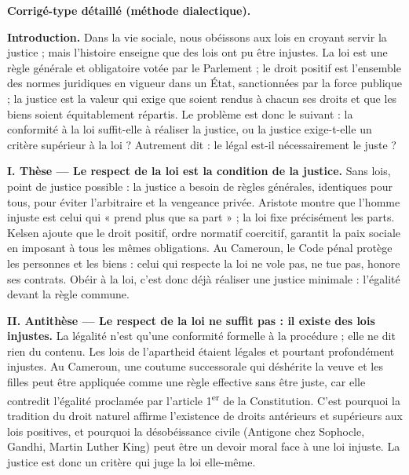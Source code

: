 \documentclass[11pt]{article}
\newcommand{\cle}[1]{{\popxbold\color{popdark}#1}}
\begin{document}
\begin{corrige}
\textbf{Corrigé-type détaillé (méthode dialectique).}

\textbf{Introduction.} Dans la vie sociale, nous obéissons aux lois en croyant servir la justice ; mais l'histoire enseigne que des lois ont pu être injustes. La \cle{loi} est une règle générale et obligatoire votée par le Parlement ; le \cle{droit positif} est l'ensemble des normes juridiques en vigueur dans un État, sanctionnées par la force publique ; la \cle{justice} est la valeur qui exige que soient rendus à chacun ses droits et que les biens soient équitablement répartis. Le problème est donc le suivant : la conformité à la loi suffit-elle à réaliser la justice, ou la justice exige-t-elle un critère supérieur à la loi ? Autrement dit : le légal est-il nécessairement le juste ?

\textbf{I. Thèse — Le respect de la loi est la condition de la justice.} Sans lois, point de justice possible : la justice a besoin de règles générales, identiques pour tous, pour éviter l'arbitraire et la vengeance privée. Aristote montre que l'homme injuste est celui qui « prend plus que sa part » ; la loi fixe précisément les parts. Kelsen ajoute que le droit positif, ordre normatif coercitif, garantit la paix sociale en imposant à tous les mêmes obligations. Au Cameroun, le Code pénal protège les personnes et les biens : celui qui respecte la loi ne vole pas, ne tue pas, honore ses contrats. Obéir à la loi, c'est donc déjà réaliser une justice minimale : l'égalité devant la règle commune.

\textbf{II. Antithèse — Le respect de la loi ne suffit pas : il existe des lois injustes.} La légalité n'est qu'une conformité formelle à la procédure ; elle ne dit rien du contenu. Les lois de l'apartheid étaient légales et pourtant profondément injustes. Au Cameroun, une coutume successorale qui déshérite la veuve et les filles peut être appliquée comme une règle effective sans être juste, car elle contredit l'égalité proclamée par l'article 1\textsuperscript{er} de la Constitution. C'est pourquoi la tradition du droit naturel affirme l'existence de droits antérieurs et supérieurs aux lois positives, et pourquoi la désobéissance civile (Antigone chez Sophocle, Gandhi, Martin Luther King) peut être un devoir moral face à une loi injuste. La justice est donc un critère qui juge la loi elle-même.


\end{corrige}
\end{document}
